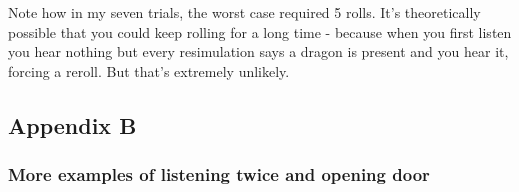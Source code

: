 \documentclass[12pt]{article}
\begin{document}
Note how in my seven trials, the worst case required 5 rolls. It's
theoretically possible that you could keep rolling for a long time -
because when you first listen you hear nothing but every resimulation
says a dragon is present and you hear it, forcing a reroll. But
that's extremely unlikely.

\hypertarget{appendix-b}{%
\subsection*{Appendix B}\label{appendix-b}}
\subsubsection*{More examples of listening twice and opening door}
\end{document}
